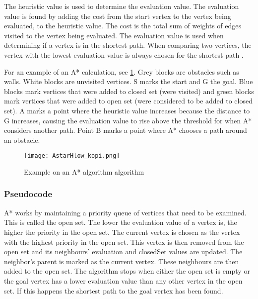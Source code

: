   The heuristic value is used to determine the evaluation value. The evaluation value is found by adding the cost from the start vertex to the vertex being evaluated, to the heuristic value. The cost is the total sum of weights of edges visited to the vertex being evaluated. The evaluation value is used when determining if a vertex is in the shortest path. When comparing two vertices, the vertex with the lowest evaluation value is always chosen for the shortest path \cite{Patel2013}.


  For an example of an A* calculation, see \cref{fig:astar}. 
  Grey blocks are obstacles such as walls. White blocks are unvisited vertices. S marks the start and G the goal. Blue blocks mark vertices that were added to closed set (were visited) and green blocks mark vertices that were added to open set (were considered to be added to closed set). A marks a point where the heuristic value increases because the distance to G increases, causing the evaluation value to rise above the threshold for when A* considers another path. Point B marks a point where A* chooses a path around an obstacle.

    \begin{figure}[ht!]
    \centering
    \texttt{[image: AstarHlow\_kopi.png]}
    \caption{Example on an A* algorithm algorithm}
    \label{fig:astar}
  \end{figure}





\subsubsection{Pseudocode}

A* works by maintaining a priority queue of vertices that need to be examined. This is called the open set. The lower the evaluation value of a vertex is, the higher the priority in the open set. The current vertex is chosen as the vertex with the highest priority in the open set. This vertex is then removed from the open set and its neighbours' evaluation and closedSet values are updated. The neighbor's parent is marked as the current vertex. These neighbours are then added to the open set. The algorithm stops when either the open set is empty or the goal vertex has a lower evaluation value than any other vertex in the open set. If this happens the shortest path to the goal vertex has been found.

